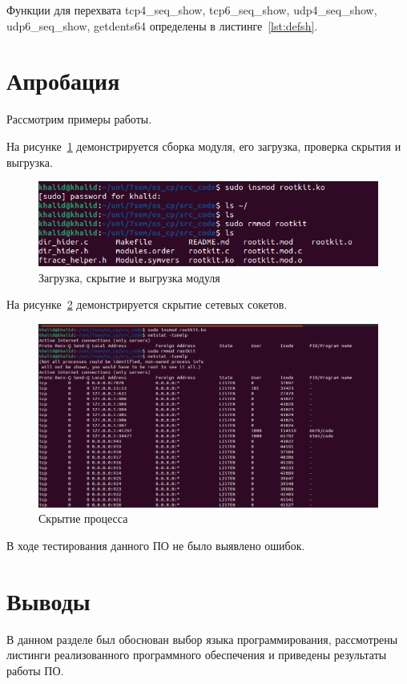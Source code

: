 Функции для перехвата tcp4\_seq\_show, tcp6\_seq\_show, udp4\_seq\_show, udp6\_seq\_show, getdents64 определены в листинге~\ref{lst:defsh}.

\section{Апробация}%
\label{sec:aprobatsiia}

Рассмотрим примеры работы.

На рисунке~\ref{img:module_hide} демонстрируется сборка модуля, его загрузка, проверка скрытия и выгрузка.
\begin{figure}[H]
    \centering
    \includegraphics[scale=0.4]{img/file_and_directory.jpg}
    \caption{Загрузка, скрытие и выгрузка модуля}\label{img:module_hide}
\end{figure}

На рисунке~\ref{img:net_hide} демонстрируется скрытие сетевых сокетов.
\begin{figure}[H]
    \centering
    \includegraphics[scale=0.65]{img/net_sockets.jpg}
    \caption{Скрытие процесса}\label{img:net_hide}
\end{figure}

В ходе тестирования данного ПО не было выявлено ошибок.

\section*{Выводы}%
\label{sec:vyvody}

В данном разделе был обоснован выбор языка программирования, рассмотрены листинги реализованного программного обеспечения и приведены результаты работы ПО.

